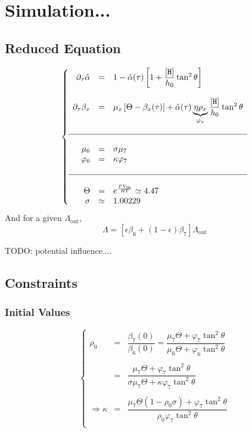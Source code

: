 \documentclass[aps,onecolumn,12pt]{revtex4}
\newcommand{\mychem}[1]{\mathtt{#1}}
\newcommand{\myconc}[1]{\left\lbrack{#1}\right\rbrack}
\newcommand{\spproton}{\mychem{H}}
\newcommand{\proton}{\myconc{\spproton}}
\newcommand{\LiAll}{\Lambda}
\newcommand{\LiAllOut}{{\LiAll}_{\mathrm{out}}}
\begin{document}
\section{Simulation...}

\subsection{Reduced Equation}
\begin{equation}
\left\lbrace
\begin{array}{rcl}
	\partial_\tau \hat\alpha & = & 1 - \hat\alpha(\tau) \left[ 1 + \dfrac{\proton}{h_0} \tan^2\theta\right]\\
	\\
	\partial_\tau \beta_x    & = & \mu_x\left[\Theta-\beta_x(\tau)\right] + \hat\alpha(\tau) \underbrace{\eta \rho_x}_{\varphi_x} \dfrac{\proton}{h_0} \tan^2\theta
	\\
	\\
	\hline
	\\
	\mu_6     & = & \sigma \mu_7\\
	\varphi_6 & = & \kappa \varphi_7\\
	\\
	\hline
	\\
	\Theta    & = & e^{\frac{FV_m}{RT}} \simeq 4.47\\
	\sigma    & \simeq & 1.00229 \\
\end{array}
\right.
\end{equation}
And for a given $\LiAllOut$,
\begin{equation}
	\LiAll = \left[ \epsilon \beta_6 + (1-\epsilon) \beta_7 \right] \LiAllOut
\end{equation}

TODO: potential influence....

\subsection{Constraints}
\subsubsection{Initial Values}
\begin{equation}
\left\lbrace
\begin{array}{rcl}
	\rho_0 & = &  \dfrac{\beta_7(0)}{\beta_6(0)} = \dfrac{\mu_7 \Theta + \varphi_7 \tan^2\theta}{\mu_6 \Theta + \varphi_6 \tan^2\theta} \\
		\\
		& = &  \dfrac{\mu_7 \Theta + \varphi_7 \tan^2\theta}{\sigma\mu_7 \Theta + \kappa\varphi_7 \tan^2\theta}\\
		\\
	\Rightarrow	\kappa & =  & \dfrac{\mu_7\Theta \left(1-\rho_0\sigma\right) + \varphi_7 \tan^2\theta}{\rho_0\varphi_7 \tan^2\theta} \\
\end{array}
\right.
\end{equation}
\end{document}

